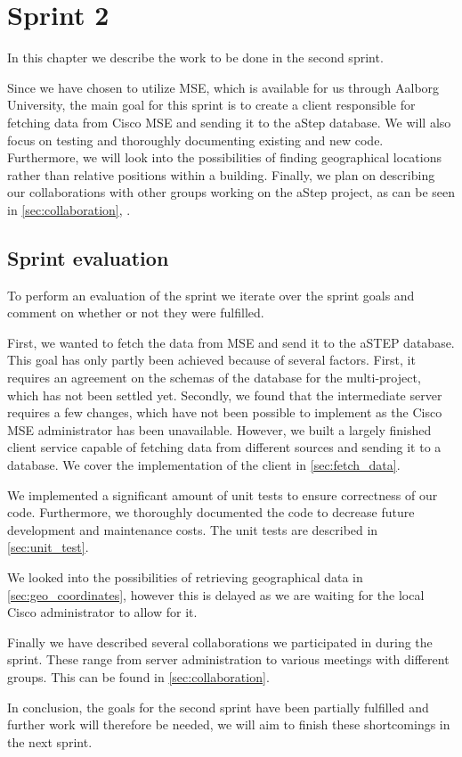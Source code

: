 \chapter{Sprint 2} \label{cha:sprint2}
In this chapter we describe the work to be done in the second sprint. 

Since we have chosen to utilize MSE, which is available for us through Aalborg University, the main goal for this sprint is to create a client responsible for fetching data from Cisco MSE and sending it to the aStep database. We will also focus on testing and thoroughly documenting existing and new code. Furthermore, we will look into the possibilities of finding geographical locations rather than relative positions within a building. Finally, we plan on describing our collaborations with other groups working on the aStep project, as can be seen in \cref{sec:collaboration}, .





\section{Sprint evaluation}\label{sec:s2_eval}
To perform an evaluation of the sprint we iterate over the sprint goals and comment on whether or not they were fulfilled.

First, we wanted to fetch the data from MSE and send it to the aSTEP database. This goal has only partly been achieved because of several factors. First, it requires an agreement on the schemas of the database for the multi-project, which has not been settled yet. Secondly, we found that the intermediate server requires a few changes, which have not been possible to implement as the Cisco MSE administrator has been unavailable. However, we built a largely finished client service capable of fetching data from different sources and sending it to a database. We cover the implementation of the client in \cref{sec:fetch_data}.

We implemented a significant amount of unit tests to ensure correctness of our code. Furthermore, we thoroughly documented the code to decrease future development and maintenance costs. The unit tests are described in \cref{sec:unit_test}.

We looked into the possibilities of retrieving geographical data in \cref{sec:geo_coordinates}, however this is delayed as we are waiting for the local Cisco administrator to allow for it.

Finally we have described several collaborations we participated in during the sprint. These range from server administration to various meetings with different groups. This can be found in \cref{sec:collaboration}. 

In conclusion, the goals for the second sprint have been partially fulfilled and further work will therefore be needed, we will aim to finish these shortcomings in the next sprint.